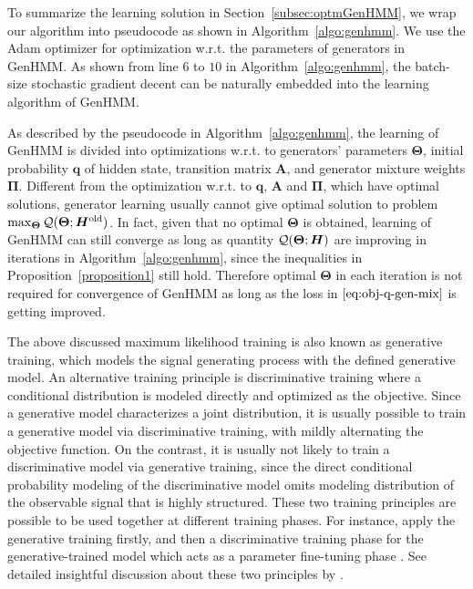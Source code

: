 To summarize the learning solution in Section~\ref{subsec:optmGenHMM}, we wrap our algorithm into pseudocode as shown in Algorithm~\ref{algo:genhmm}. We use the Adam \cite{DBLP:journals/corr/KingmaB14} optimizer for optimization w.r.t. the parameters of generators in GenHMM. As shown from line $6$ to $10$ in Algorithm~\ref{algo:genhmm}, the batch-size stochastic gradient decent can be naturally embedded into the learning algorithm of GenHMM.

As described by the pseudocode in Algorithm~\ref{algo:genhmm}, the learning of GenHMM is divided into optimizations w.r.t. to generators' parameters $\bm{\Theta}$, initial probability $\bm{q}$ of hidden state, transition matrix $\bm{A}$, and generator mixture weights $\bm{\Pi}$. Different from the optimization w.r.t. to $\bm{q}$, $\bm{A}$ and $\bm{\Pi}$, which have optimal solutions, generator learning usually cannot give optimal solution to problem $\max_{\bm{\Theta}} \mathcal{Q}(\bm{\Theta}; \bm{H}^{\mathrm{old}})$. In fact, given that no optimal $\bm{\Theta}$ is obtained, learning of GenHMM can still converge as long as quantity $\mathcal{Q}(\bm{\Theta}; \bm{H})$ are improving in iterations in Algorithm~\ref{algo:genhmm}, since the inequalities in Proposition~\ref{proposition1} still hold. Therefore optimal $\bm{\Theta}$ in each iteration is not required for convergence of GenHMM as long as the loss in $\eqref{eq:obj-q-gen-mix}$ is getting improved.
\begin{remark}
  \label{chpt7:rmk:generative-discriminative}
  {The above discussed maximum likelihood training is also known as generative training, which models the signal generating process with the defined generative model. An alternative training principle is discriminative training where a conditional distribution is modeled directly and optimized as the objective. Since a generative model characterizes a joint distribution, it is usually possible to train a generative model via discriminative training, with mildly alternating the objective function. On the contrast, it is usually not likely to train a discriminative model via generative training, since the direct conditional probability modeling of the discriminative model omits modeling distribution of the observable signal that is highly structured. These two training principles are possible to be used together at different training phases. For instance, apply the generative training firstly, and then a discriminative training phase for the generative-trained model which acts as a parameter fine-tuning phase \cite{hinton2012deepSpeech}. See detailed insightful discussion about these two principles by \cite{lasserre2006principled}.
  }
\end{remark}


